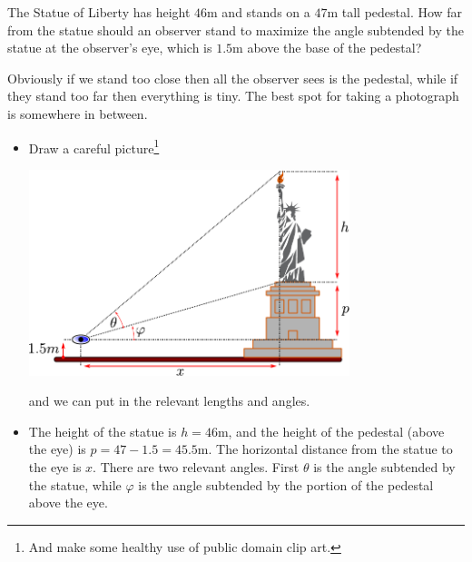 \begin{eg}\label{APPglobalMaxMinG}
The Statue of Liberty has height $46$m and stands on a $47$m
tall pedestal. How far from the statue should an observer stand
to maximize the angle subtended by the statue at the observer's eye,
which is $1.5$m above the base of the pedestal?


\soln Obviously if we stand too close then all the observer sees is the
pedestal, while if they stand too far then everything is tiny. The best spot
for taking a photograph is somewhere in between.
\begin{itemize}
 \item Draw a careful picture\footnote{And make some healthy use of public
domain clip art.}
\begin{efig}
\begin{center}
   \includegraphics[height=6cm]{extra/liberty}
\end{center}
\end{efig}
and we can put in the relevant lengths and angles.

\item The height of the statue is $h = 46$m, and the height of the pedestal (above the
eye) is $p = 47-1.5 = 45.5$m. The horizontal distance from the statue to the eye is $x$.
There are two relevant angles. First $\theta$ is the angle subtended by the statue, while
$\varphi$ is the angle subtended by the portion of the pedestal above the eye.


\end{itemize}
\end{eg}
